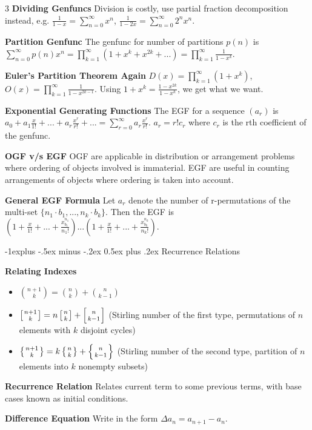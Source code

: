 \documentclass[10pt, landscape]{article}
\makeatletter
\renewcommand{\section}{\@startsection{section}{1}{0mm}%
                                {-1ex plus -.5ex minus -.2ex}%
                                {0.5ex plus .2ex}%
                                {\normalfont\large\bfseries}}
\renewcommand{\section}{\@startsection{section}{2}{0mm}%
                                {-1explus -.5ex minus -.2ex}%
                                {0.5ex plus .2ex}%
                                {\normalfont\normalsize\bfseries}}
\makeatother
\begin{document}
\begin{multicols*}{3}
\textbf{Dividing Genfuncs} Division is costly, use partial fraction decomposition instead, e.g. $\frac{1}{1-x}=\sum_{n=0}^\infty x^n$, $\frac{1}{1-2x}=\sum_{n=0}^\infty 2^n x^n$.

\textbf{Partition Genfunc} The genfunc for number of partitions $p(n)$ is $\sum_{n=0}^\infty p(n)x^n=\prod_{k=1}^\infty(1+x^k+x^{2k}+...)=\prod_{k=1}^\infty \frac{1}{1-x^k}$.

\textbf{Euler's Partition Theorem Again} $D(x)=\prod_{k=1}^\infty (1+x^k)$, $O(x)=\prod_{k=1}^\infty \frac{1}{1-x^{2k-1}}$. Using $1+x^k=\frac{1-x^{2k}}{1-x^k}$, we get what we want.

\textbf{Exponential Generating Functions} The EGF for a sequence $(a_r)$ is $a_0+a_1\frac{x}{1!}+...+a_r\frac{x^r}{r!}+...=\sum_{r=0}^\infty a_r\frac{x^r}{r!}$. $a_r=r! c_r$ where $c_r$ is the rth coefficient of the genfunc.

\textbf{OGF v/s EGF} OGF are applicable in distribution or arrangement problems where ordering of objects involved is immaterial. EGF are useful in counting arrangements of objects where ordering is taken into account.

\textbf{General EGF Formula} Let $a_r$ denote the number of r-permutations of the multi-set $\{n_1 \cdot b_1, ... , n_k \cdot b_k\}$. Then the EGF is $(1+\frac{x}{1!}+...+\frac{x^{n_1}_{b_1}}{n_1!})...(1+\frac{x}{1!}+...+\frac{x^{n_k}_{b_k}}{n_k!})$.

\section{Recurrence Relations}

\textbf{Relating Indexes}
\begin{itemize}
    \item ${n+1\choose k}={n \choose k}+{n \choose k-1}$
    \item $\left[n + 1 \atop k\right]=n \left[n \atop k \right]+\left[n \atop k-1\right]$ (Stirling number of the first type, permutations of $n$ elements with $k$ disjoint cycles)
    \item $\left \{ n+1 \atop k \right\}=k\left \{ n \atop k \right \}+\left \{n \atop k-1\right\}$ (Stirling number of the second type, partition of $n$ elements into $k$ nonempty subsets)
\end{itemize}

\textbf{Recurrence Relation} Relates current term to some previous terms, with base cases known as initial conditions.

\textbf{Difference Equation} Write in the form $\Delta a_n=a_{n+1}-a_n$.


\end{multicols*}
\end{document}
